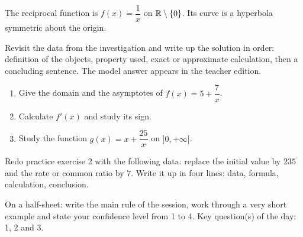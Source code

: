 \begin{traceecrite}The reciprocal function is $f(x)=\dfrac1x$ on $\mathbb{R}\setminus\{0\}$. Its curve is a hyperbola symmetric about the origin.\end{traceecrite}

\begin{exemple}
Revisit the data from the investigation and write up the solution in order: definition of the objects, property used, exact or approximate calculation, then a concluding sentence. The model answer appears in the teacher edition.
\end{exemple}

\begin{exercice}[-- essential]
\begin{enumerate}\item Give the domain and the asymptotes of $f(x)=5+\dfrac{7}x$.\item Calculate $f'(x)$ and study its sign.\item Study the function $g(x)=x+\dfrac{25}x$ on $]0,+\infty[$.\end{enumerate}
\end{exercice}


\begin{dm}Redo practice exercise 2 with the following data: replace the initial value by $235$ and the rate or common ratio by $7$. Write it up in four lines: data, formula, calculation, conclusion.\end{dm}

\begin{sortie}On a half-sheet: write the main rule of the session, work through a very short example and state your confidence level from 1 to 4. Key question(s) of the day: 1, 2 and 3.\end{sortie}


